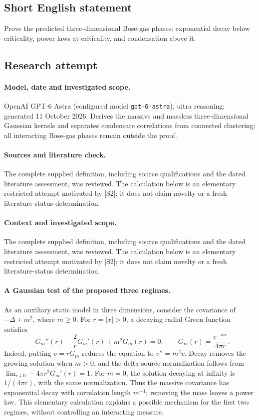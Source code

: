 \documentclass[11pt]{article}
\begin{document}
\subsection{Short English statement}
Prove the predicted three-dimensional Bose-gas phases: exponential decay below criticality, power laws at criticality, and condensation above it.
\subsection{Research attempt}
\paragraph{Model, date and investigated scope.}
OpenAI GPT-6 Astra (configured model \texttt{gpt-6-astra}), ultra reasoning; generated 11 October 2026. Derives the massive and massless three-dimensional Gaussian kernels and separates condensate correlations from connected clustering; all interacting Bose-gas phases remain outside the proof.

\paragraph{Sources and literature check.}
The complete supplied definition, including source qualifications and the dated literature assessment, was reviewed. The calculation below is an elementary restricted attempt motivated by [S2]; it does not claim novelty or a fresh literature-status determination.

\paragraph{Context and investigated scope.} The complete supplied definition, including source qualifications and the dated literature assessment, was reviewed. The calculation below is an elementary restricted attempt motivated by [S2]; it does not claim novelty or a fresh literature-status determination.

\paragraph{A Gaussian test of the proposed three regimes.}
As an auxiliary static model in three dimensions, consider the covariance of $-\Delta+m^2$, where $m\geq0$. For $r=|x|>0$, a decaying radial Green function satisfies
\[
 -G_m''(r)-\frac2rG_m'(r)+m^2G_m(r)=0,
 \qquad G_m(r)=\frac{e^{-mr}}{4\pi r}.
\]
Indeed, putting $v=rG_m$ reduces the equation to $v''=m^2v$. Decay removes the growing solution when $m>0$, and the delta-source normalization follows from
$\lim_{r\downarrow0}-4\pi r^2G_m'(r)=1$.
For $m=0$, the solution decaying at infinity is $1/(4\pi r)$, with the same normalization. Thus the massive covariance has exponential decay with correlation length $m^{-1}$; removing the mass leaves a power law. This elementary calculation explains a possible mechanism for the first two regimes, without controlling an interacting measure.
\end{document}
